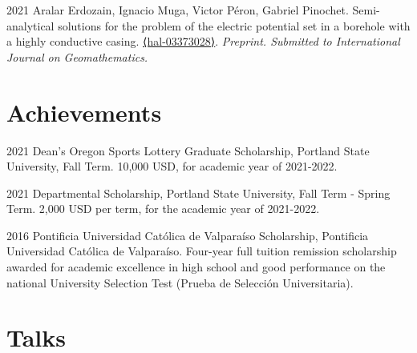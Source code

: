 \documentclass[12pt,letterpaper]{report}
\begin{document}
    \begin{tablist}

    \item[2021] \tab Aralar Erdozain, Ignacio Muga, Victor P\'eron, Gabriel Pinochet. Semi-analytical solutions for the problem of the electric potential set in a borehole with a highly conductive casing. \href{https://hal.archives-ouvertes.fr/hal-03373028}{⟨hal-03373028⟩}. \emph{Preprint. Submitted to International Journal on Geomathematics.}

    \end{tablist}

    \section*{Achievements}

    \begin{tablist}

        \item[2021] \tab Dean's Oregon Sports Lottery Graduate Scholarship, Portland State University, Fall Term. 10,000 USD, for academic year of 2021-2022.

        \item[2021] \tab Departmental Scholarship, Portland State University, Fall Term - Spring Term. 2,000 USD per term, for the academic year of 2021-2022.


        \item[2016] \tab Pontificia Universidad Cat\'olica de Valpara\'iso Scholarship, Pontificia Universidad Cat\'olica de Valpara\'iso. Four-year full tuition remission scholarship awarded for academic excellence in high school and good performance on the national University Selection Test (Prueba de Selecci\'on Universitaria).

    \end{tablist}

    \section*{Talks}
\end{document}
